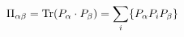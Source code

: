 \begin{equation}        
         \Pi_{\alpha\beta}={\rm Tr}(P_\alpha\cdot P_\beta)=\sum_{i}^{}\{P_\alpha 
P_i P_\beta\}     
\end{equation}

